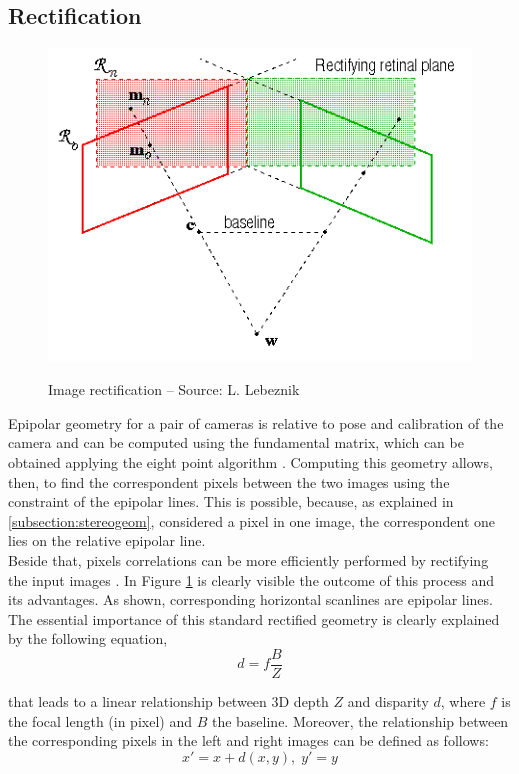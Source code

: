 \subsection{Rectification}
\label{subsection:rectification}
\begin{figure}[t]
	\begin{center}
		{\includegraphics[width=.8\textwidth]{images/rectification}}
\caption{Image rectification -- Source: L. Lebeznik}
\label{fig:rectification}
	\end{center}
\end{figure}

Epipolar geometry for a pair of cameras is relative to pose and calibration of the camera and can be computed using the fundamental matrix, which can be obtained applying the eight point algorithm \citep{hartley2004multiple}.
Computing this geometry allows, then, to find the correspondent pixels between the two images using the constraint of the epipolar lines.
This is possible, because, as explained in \ref{subsection:stereogeom}, considered a pixel in one image, the correspondent one lies on the relative epipolar line.\\
Beside that, pixels correlations can be more efficiently performed by rectifying the input images \citep{hartley2004multiple}.
In Figure \ref{fig:rectification} is clearly visible the outcome of this process and its advantages.
As shown, corresponding horizontal scanlines are epipolar lines. 
The essential importance of this standard rectified geometry is clearly explained by the following equation,
\begin{equation} \label{eqn:disparity-depth}
	d = f \frac{B}{Z}
\end{equation}

that leads to a linear relationship between 3D depth $Z$ and disparity $d$, where $f$ is the focal length (in pixel) and $B$ the baseline.
Moreover, the relationship between the corresponding pixels in the left and right images can be defined as follows:
\begin{equation} \label{eqn:corresponding-pixel}
	x' = x + d(x, y), \; y' = y
\end{equation}

